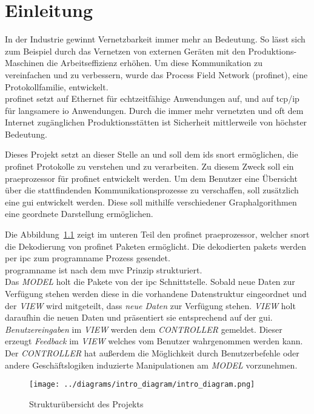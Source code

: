 \chapter{Einleitung}

In der Industrie gewinnt Vernetzbarkeit immer mehr an Bedeutung. So lässt sich zum Beispiel durch das Vernetzen von externen Geräten mit den Produktions-Maschinen die Arbeitseffizienz erhöhen. Um diese Kommunikation zu vereinfachen und zu verbessern, wurde das Process Field Network (\gls{profinet}), eine Protokollfamilie, entwickelt.\\
\gls{profinet} setzt auf Ethernet für echtzeitfähige Anwendungen auf, und auf \gls{tcp}/\gls{ip} für langsamere \gls{io} Anwendungen. Durch die immer mehr vernetzten und oft dem Internet zugänglichen Produktionsstätten ist Sicherheit mittlerweile von höchster Bedeutung. \par
Dieses Projekt setzt an dieser Stelle an und soll dem \gls{ids} \gls{snort} ermöglichen, die \gls{profinet} Protokolle zu verstehen und zu verarbeiten. Zu diesem Zweck soll ein \gls{praeprozessor} für \gls{profinet} entwickelt werden. Um dem Benutzer eine Übersicht über die stattfindenden Kommunikationsprozesse zu verschaffen, soll zusätzlich eine \gls{gui} entwickelt werden. Diese soll mithilfe verschiedener Graphalgorithmen eine geordnete Darstellung ermöglichen.\par
Die Abbildung~\ref{fig:diagram} zeigt im unteren Teil den \gls{profinet} \gls{praeprozessor}, welcher \gls{snort} die Dekodierung von \gls{profinet} Paketen ermöglicht. Die dekodierten \glspl{paket} werden per \gls{ipc} zum \gls{programname} Prozess gesendet.\\
\Gls{programname} ist nach dem \gls{mvc} Prinzip strukturiert.\\
Das \textit{MODEL} holt die Pakete von der \gls{ipc} Schnittstelle. Sobald neue Daten zur Verfügung stehen werden diese in die vorhandene Datenstruktur eingeordnet und der \textit{VIEW} wird mitgeteilt, dass \textit{neue Daten} zur Verfügung stehen. \textit{VIEW} holt daraufhin die neuen Daten und präsentiert sie entsprechend auf der \gls{gui}.\\
\textit{Benutzereingaben} im \textit{VIEW} werden dem \textit{CONTROLLER} gemeldet. Dieser erzeugt \textit{Feedback} im \textit{VIEW} welches vom Benutzer wahrgenommen werden kann. Der \textit{CONTROLLER} hat außerdem die Möglichkeit durch Benutzerbefehle oder andere Geschäftslogiken induzierte Manipulationen am \textit{MODEL} vorzunehmen.

\begin{figure}[h]
  \centering
  \texttt{[image: ../diagrams/intro\_diagram/intro\_diagram.png]}
  \caption[Strukturübersicht des Projekts]{Strukturübersicht des Projekts}\label{fig:diagram}
\end{figure}